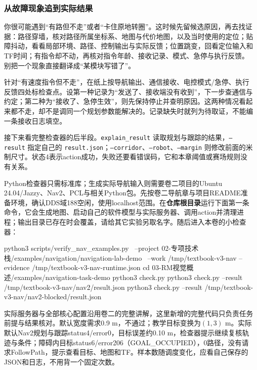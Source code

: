 \subsubsection{从故障现象追到实际结果}

你很可能遇到“有路但不走”或者“卡住原地转圈”。这时候先留候选原因，再去找证据：路径穿墙，核对路径所属坐标系、地图与代价地图，以及当时使用的定位；贴障抖动，看看局部环境、路径、控制输出与实际反馈；位置跳变，回看定位输入和TF时间；有指令却不动，再核对指令年龄、接收记录、模式、急停与执行反馈。别把一个现象直接翻译成“某模块写错了”。

\begin{example}[从现象追到证据]
针对“有速度指令但不走”，在纸上按导航输出、通信接收、电控模式/急停、执行反馈四处标检查点。设第一种记录为“发送了、接收端没有收到”，下一步查通信与约定；第二种为“接收了、急停生效”，则先保持停止并查明原因。这两种情况看起来都不走，却不是调同一个规划参数能解决的。记录缺失时就列为待取证，不能编一条接收日志填空。
\end{example}

接下来看完整检查器的后半段。\texttt{explain\_result} 读取规划与跟踪的结果，\texttt{--result} 指定自己的 \texttt{result.json}；\texttt{--corridor}、\texttt{--robot}、\texttt{--margin} 则修改前面的米制尺寸。状态4表示action成功，失败还要看错误码，它和本章阈值或赛场规则没有关系。


\begin{example}[复用实际Nav2日志]
Python检查器只需标准库；生成实际导航输入则需要卷二项目的Ubuntu 24.04/Jazzy、Nav2、PCL与相关Python包。先按卷二导航章与项目README准备环境，确认DDS域188空闲，使用localhost范围。在\textbf{仓库根目录}运行下面第一条命令，它会生成地图、启动自己的软件模型与实际服务器、调用action并清理进程；输出目录已存在时会覆盖，请给其它实验另取名字。随后进入本卷的小检查器：
\begin{tbash}
python3 scripts/verify_nav_examples.py \
  --project 02-专项技术栈/examples/navigation/navigation-lab-demo \
  --work /tmp/textbook-v3-nav --evidence /tmp/textbook-v3-nav-runtime.json
cd 03-RM视觉概述/examples/navigation-task-demo
python3 check.py
python3 check.py --result /tmp/textbook-v3-nav/nav2/result.json
python3 check.py --result /tmp/textbook-v3-nav/nav2-blocked/result.json
\end{tbash}
实际服务器与全部核心配置沿用卷二的完整讲解，这里新增的完整代码只负责任务前提与结果核对。默认宽度需求0.9 m，不通过；教学目标变换为$(1,3)$ m。实际默认Nav2规划与跟踪status4/error0，目标误差约0.10 m，检查器提示继续复核轨迹与条件；障碍内目标status6/error206（GOAL\_OCCUPIED），0路径，没有请求FollowPath，提示查看目标、地图和TF。样本数随调度变化，应看自己保存的JSON和日志，不用背一个固定次数。
\end{example}

